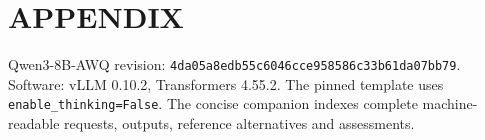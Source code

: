 \documentclass[a4paper,twoside]{article}
\begin{document}

{\small}
\section*{APPENDIX}
\noindent Qwen3-8B-AWQ revision: \texttt{4da05a8edb55c6046cce9585}\allowbreak\texttt{86c33b61da07bb79}. Software: vLLM 0.10.2, Transformers 4.55.2. The pinned template uses \texttt{enable\_thinking=False}. The concise companion indexes complete machine-readable requests, outputs, reference alternatives and assessments.
\end{document}
